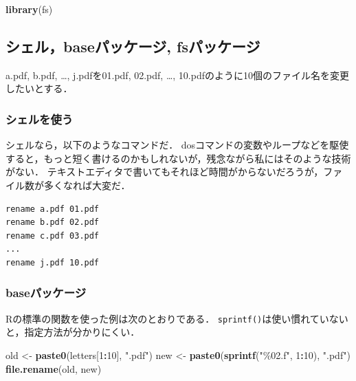 \documentclass[
]{article}
\newenvironment{Shaded}{\begin{snugshade}}{\end{snugshade}}
\newcommand{\DecValTok}[1]{\textcolor[rgb]{0.00,0.00,0.81}{#1}}
\newcommand{\FunctionTok}[1]{\textcolor[rgb]{0.13,0.29,0.53}{\textbf{#1}}}
\newcommand{\NormalTok}[1]{#1}
\newcommand{\OtherTok}[1]{\textcolor[rgb]{0.56,0.35,0.01}{#1}}
\newcommand{\SpecialCharTok}[1]{\textcolor[rgb]{0.81,0.36,0.00}{\textbf{#1}}}
\newcommand{\StringTok}[1]{\textcolor[rgb]{0.31,0.60,0.02}{#1}}
\begin{document}
\begin{Shaded}
\begin{Highlighting}[]
\FunctionTok{library}\NormalTok{(fs)}
\end{Highlighting}
\end{Shaded}

\hypertarget{ux30b7ux30a7ux30ebbaseux30d1ux30c3ux30b1ux30fcux30b8-fsux30d1ux30c3ux30b1ux30fcux30b8}{%
\subsection{シェル，baseパッケージ, fsパッケージ}\label{ux30b7ux30a7ux30ebbaseux30d1ux30c3ux30b1ux30fcux30b8-fsux30d1ux30c3ux30b1ux30fcux30b8}}

a.pdf, b.pdf, \ldots, j.pdfを01.pdf, 02.pdf, \ldots, 10.pdfのように10個のファイル名を変更したいとする．

\hypertarget{ux30b7ux30a7ux30ebux3092ux4f7fux3046}{%
\subsubsection{シェルを使う}\label{ux30b7ux30a7ux30ebux3092ux4f7fux3046}}

シェルなら，以下のようなコマンドだ．
dosコマンドの変数やループなどを駆使すると，もっと短く書けるのかもしれないが，残念ながら私にはそのような技術がない．
テキストエディタで書いてもそれほど時間がからないだろうが，ファイル数が多くなれば大変だ．

\begin{verbatim}
rename a.pdf 01.pdf
rename b.pdf 02.pdf
rename c.pdf 03.pdf
...
rename j.pdf 10.pdf
\end{verbatim}

\hypertarget{baseux30d1ux30c3ux30b1ux30fcux30b8}{%
\subsubsection{baseパッケージ}\label{baseux30d1ux30c3ux30b1ux30fcux30b8}}

Rの標準の関数を使った例は次のとおりである．
\texttt{sprintf()}は使い慣れていないと，指定方法が分かりにくい．

\begin{Shaded}
\begin{Highlighting}[]
\NormalTok{old }\OtherTok{\textless{}{-}} \FunctionTok{paste0}\NormalTok{(letters[}\DecValTok{1}\SpecialCharTok{:}\DecValTok{10}\NormalTok{], }\StringTok{".pdf"}\NormalTok{)}
\NormalTok{new }\OtherTok{\textless{}{-}} \FunctionTok{paste0}\NormalTok{(}\FunctionTok{sprintf}\NormalTok{(}\StringTok{"\%02.f"}\NormalTok{, }\DecValTok{1}\SpecialCharTok{:}\DecValTok{10}\NormalTok{), }\StringTok{".pdf"}\NormalTok{)}
\FunctionTok{file.rename}\NormalTok{(old, new)}
\end{Highlighting}
\end{Shaded}
\end{document}

